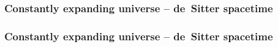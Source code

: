 \documentclass[11pt]{beamer}
\begin{document}
\begin{frame}
	\frametitle{Constantly expanding universe -- de~Sitter spacetime}
	\vspace*{0.05cm}\hspace*{-0.2cm}
\end{frame}

\begin{frame}
	\frametitle{Constantly expanding universe -- de~Sitter spacetime}
	\vspace*{0.05cm}\hspace*{-0.2cm}
\end{frame}
\end{document}
